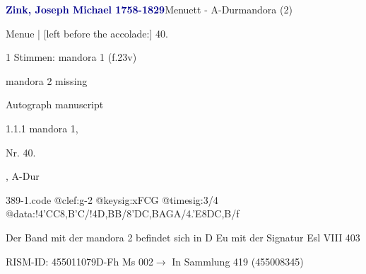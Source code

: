 \documentclass[twocolumn, 12pt]{book}
\begin{document}
\par \vspace{16pt} \textcolor{darkblue}{\textbf{Zink, Joseph Michael  1758-1829}}\hfillplus{\textbf{[389]}}\newline Menuett - A-Dur\newline mandora (2)
\par \begin{itshape}[f.23v, at left:] Menue | [left before the accolade:] 40.\end{itshape} 
\par \textcolor{darkblue}{}  1 Stimmen: mandora 1  (f.23v)\newline \begin{small} mandora 2 missing\end{small} \newline Autograph manuscript
\par 1.1.1  mandora 1, \begin{itshape}Nr. 40.\end{itshape}, A-Dur  
\begin{filecontents*}{389-1.code}
@clef:g-2
@keysig:xFCG
@timesig:3/4
@data:!4'CC{8,B'C}/!4D,BB/{8'DC},BA{GA}/4.'E{8DC,B}/f
\end{filecontents*}
\newline %
\par Der Band mit der mandora 2 befindet sich in D Eu mit der Signatur Esl VIII 403
\par RISM-ID: 455011079\newline D-Fh  Ms 002\newline $\rightarrow$ In Sammlung 419 (455008345)
      
\end{document}
